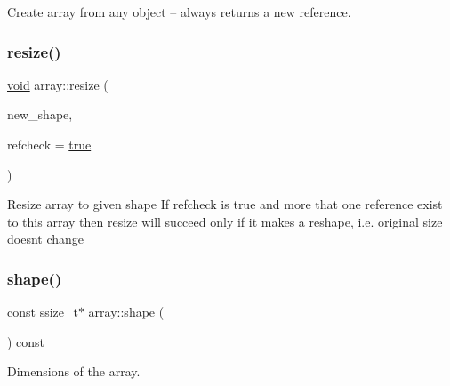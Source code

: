 Create array from any object -- always returns a new reference. 

\mbox{\label{classarray_a3e03dfffbf6c992364c052cf615db45b}} 
\subsubsection{\texorpdfstring{resize()}{resize()}}
{\footnotesize\ttfamily \mbox{\hyperlink{_s_d_l__opengles2__gl2ext_8h_ae5d8fa23ad07c48bb609509eae494c95}{void}} array\+::resize (\begin{DoxyParamCaption}\item[{\mbox{\hyperlink{classarray_a3378d7821106645fa3a88c5222e127e0}{Shape\+Container}}}]{new\+\_\+shape,  }\item[{\mbox{\hyperlink{asdl_8h_af6a258d8f3ee5206d682d799316314b1}{bool}}}]{refcheck = {\ttfamily \mbox{\hyperlink{asdl_8h_af6a258d8f3ee5206d682d799316314b1a08f175a5505a10b9ed657defeb050e4b}{true}}} }\end{DoxyParamCaption})\hspace{0.3cm}{\ttfamily [inline]}}

Resize array to given shape If refcheck is true and more that one reference exist to this array then resize will succeed only if it makes a reshape, i.\+e. original size doesn\textquotesingle{}t change \mbox{\label{classarray_a084781a3d2cb3ea60ab7bcf16c30ee31}} 
\subsubsection{\texorpdfstring{shape()}{shape()}\hspace{0.1cm}{\footnotesize\ttfamily [1/2]}}
{\footnotesize\ttfamily const \mbox{\hyperlink{detail_2common_8h_ac430d16fc097b3bf0a7469cfd09decda}{ssize\+\_\+t}}$\ast$ array\+::shape (\begin{DoxyParamCaption}{ }\end{DoxyParamCaption}) const\hspace{0.3cm}{\ttfamily [inline]}}



Dimensions of the array. 

\mbox{\label{classarray_aceb118afe3a4eed2b3c9ec958505e414}} 
